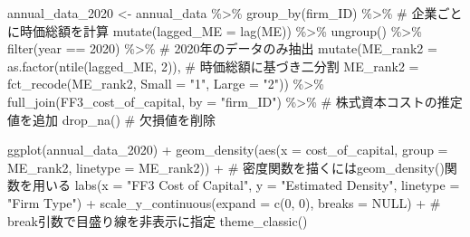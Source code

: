 \documentclass[
  letterpaper,
  DIV=11,
  numbers=noendperiod]{scrreprt}
\newenvironment{Shaded}{\begin{snugshade}}{\end{snugshade}}
\newcommand{\AttributeTok}[1]{\textcolor[rgb]{0.40,0.45,0.13}{#1}}
\newcommand{\CommentTok}[1]{\textcolor[rgb]{0.37,0.37,0.37}{#1}}
\newcommand{\ConstantTok}[1]{\textcolor[rgb]{0.56,0.35,0.01}{#1}}
\newcommand{\DecValTok}[1]{\textcolor[rgb]{0.68,0.00,0.00}{#1}}
\newcommand{\FunctionTok}[1]{\textcolor[rgb]{0.28,0.35,0.67}{#1}}
\newcommand{\NormalTok}[1]{\textcolor[rgb]{0.00,0.23,0.31}{#1}}
\newcommand{\OtherTok}[1]{\textcolor[rgb]{0.00,0.23,0.31}{#1}}
\newcommand{\SpecialCharTok}[1]{\textcolor[rgb]{0.37,0.37,0.37}{#1}}
\newcommand{\StringTok}[1]{\textcolor[rgb]{0.13,0.47,0.30}{#1}}
\begin{document}
\begin{Shaded}
\begin{Highlighting}[]
\NormalTok{annual\_data\_2020 }\OtherTok{\textless{}{-}}\NormalTok{ annual\_data }\SpecialCharTok{\%\textgreater{}\%}
  \FunctionTok{group\_by}\NormalTok{(firm\_ID) }\SpecialCharTok{\%\textgreater{}\%} \CommentTok{\# 企業ごとに時価総額を計算}
  \FunctionTok{mutate}\NormalTok{(}\AttributeTok{lagged\_ME =} \FunctionTok{lag}\NormalTok{(ME)) }\SpecialCharTok{\%\textgreater{}\%} 
  \FunctionTok{ungroup}\NormalTok{() }\SpecialCharTok{\%\textgreater{}\%}
  \FunctionTok{filter}\NormalTok{(year }\SpecialCharTok{==} \DecValTok{2020}\NormalTok{) }\SpecialCharTok{\%\textgreater{}\%} \CommentTok{\# 2020年のデータのみ抽出}
  \FunctionTok{mutate}\NormalTok{(}\AttributeTok{ME\_rank2 =} \FunctionTok{as.factor}\NormalTok{(}\FunctionTok{ntile}\NormalTok{(lagged\_ME, }\DecValTok{2}\NormalTok{)), }\CommentTok{\# 時価総額に基づき二分割}
         \AttributeTok{ME\_rank2 =} \FunctionTok{fct\_recode}\NormalTok{(ME\_rank2,}
                                     \AttributeTok{Small =} \StringTok{"1"}\NormalTok{,}
                                     \AttributeTok{Large =} \StringTok{"2"}\NormalTok{)) }\SpecialCharTok{\%\textgreater{}\%} 
  \FunctionTok{full\_join}\NormalTok{(FF3\_cost\_of\_capital, }\AttributeTok{by =} \StringTok{"firm\_ID"}\NormalTok{) }\SpecialCharTok{\%\textgreater{}\%} \CommentTok{\# 株式資本コストの推定値を追加}
  \FunctionTok{drop\_na}\NormalTok{() }\CommentTok{\# 欠損値を削除}

\FunctionTok{ggplot}\NormalTok{(annual\_data\_2020) }\SpecialCharTok{+}
  \FunctionTok{geom\_density}\NormalTok{(}\FunctionTok{aes}\NormalTok{(}\AttributeTok{x =}\NormalTok{ cost\_of\_capital, }\AttributeTok{group =}\NormalTok{ ME\_rank2, }\AttributeTok{linetype =}\NormalTok{ ME\_rank2)) }\SpecialCharTok{+} \CommentTok{\# 密度関数を描くにはgeom\_density()関数を用いる}
  \FunctionTok{labs}\NormalTok{(}\AttributeTok{x =} \StringTok{"FF3 Cost of Capital"}\NormalTok{, }\AttributeTok{y =} \StringTok{"Estimated Density"}\NormalTok{, }\AttributeTok{linetype =} \StringTok{"Firm Type"}\NormalTok{)  }\SpecialCharTok{+} 
  \FunctionTok{scale\_y\_continuous}\NormalTok{(}\AttributeTok{expand =} \FunctionTok{c}\NormalTok{(}\DecValTok{0}\NormalTok{, }\DecValTok{0}\NormalTok{), }\AttributeTok{breaks =} \ConstantTok{NULL}\NormalTok{) }\SpecialCharTok{+} \CommentTok{\# break引数で目盛り線を非表示に指定}
  \FunctionTok{theme\_classic}\NormalTok{()}
\end{Highlighting}
\end{Shaded}
\end{document}
